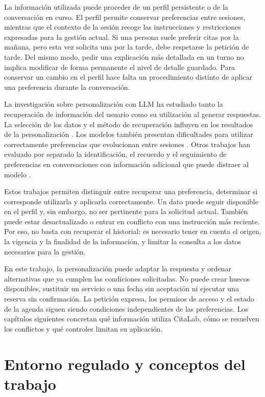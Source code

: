 La información utilizada puede proceder de un perfil persistente o de la conversación en curso. El perfil permite conservar preferencias entre sesiones, mientras que el contexto de la sesión recoge las instrucciones y restricciones expresadas para la gestión actual. Si una persona suele preferir citas por la mañana, pero esta vez solicita una por la tarde, debe respetarse la petición de tarde. Del mismo modo, pedir una explicación más detallada en un turno no implica modificar de forma permanente el nivel de detalle guardado. Para conservar un cambio en el perfil hace falta un procedimiento distinto de aplicar una preferencia durante la conversación.

La investigación sobre personalización con LLM ha estudiado tanto la recuperación de información del usuario como su utilización al generar respuestas. La selección de los datos y el método de recuperación influyen en los resultados de la personalización \citep{salemi2024lamp}. Los modelos también presentan dificultades para utilizar correctamente preferencias que evolucionan entre sesiones \citep{jiang2025personamem}. Otros trabajos han evaluado por separado la identificación, el recuerdo y el seguimiento de preferencias en conversaciones con información adicional que puede distraer al modelo \citep{zhao2025prefeval}.

Estos trabajos permiten distinguir entre recuperar una preferencia, determinar si corresponde utilizarla y aplicarla correctamente. Un dato puede seguir disponible en el perfil y, sin embargo, no ser pertinente para la solicitud actual. También puede estar desactualizado o entrar en conflicto con una instrucción más reciente. Por eso, no basta con recuperar el historial: es necesario tener en cuenta el origen, la vigencia y la finalidad de la información, y limitar la consulta a los datos necesarios para la gestión.

En este trabajo, la personalización puede adaptar la respuesta y ordenar alternativas que ya cumplen las condiciones solicitadas. No puede crear huecos disponibles, sustituir un servicio o una fecha sin aceptación ni ejecutar una reserva sin confirmación. La petición expresa, los permisos de acceso y el estado de la agenda siguen siendo condiciones independientes de las preferencias. Los capítulos siguientes concretan qué información utiliza CitaLab, cómo se resuelven los conflictos y qué controles limitan su aplicación.

\section{Entorno regulado y conceptos del trabajo}

